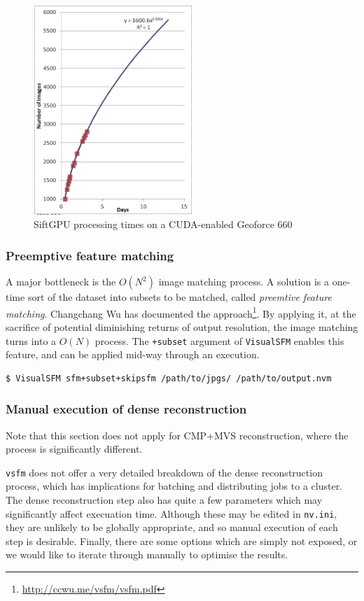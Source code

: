 \begin{figure}[h]
\begin{center}
\includegraphics[width=6cm]{siftgpu_processing_times}
\caption{SiftGPU processing times on a CUDA-enabled Geoforce 660}
\end{center}
\end{figure}

\subsubsection{Preemptive feature matching}

A major bottleneck is the $O(N^2)$ image matching process. A solution is a one-time sort of the dataset into subsets to be matched, called \emph{preemtive feature matching}. Changchang Wu has documented the approach\footnote{\url{http://ccwu.me/vsfm/vsfm.pdf}}. By applying it, at the sacrifice of potential diminishing returns of output resolution, the image matching turns into a $O(N)$ process. The {\tt +subset} argument of {\tt VisualSFM} enables this feature, and can be applied mid-way through an execution.

\begin{lstlisting}
$ VisualSFM sfm+subset+skipsfm /path/to/jpgs/ /path/to/output.nvm
\end{lstlisting}

\subsubsection{Manual execution of dense reconstruction}

Note that this section does not apply for CMP+MVS reconstruction, where the process is significantly different.

{\tt vsfm} does not offer a very detailed breakdown of the dense reconstruction process, which has implications for batching and distributing jobs to a cluster. The dense reconstruction step also has quite a few parameters which may significantly affect execuation time. Although these may be edited in {\tt nv.ini}, they are unlikely to be globally appropriate, and so manual execution of each step is desirable. Finally, there are some options which are simply not exposed, or we would like to iterate through manually to optimise the results.

